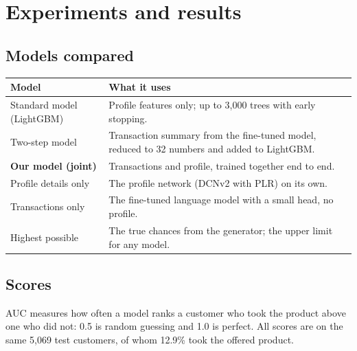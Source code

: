 \documentclass[10pt,a4paper]{article}
\begin{document}
\section{Experiments and results}
\subsection{Models compared}
\begin{tabularx}{\linewidth}{@{}L{4.6cm}X@{}}
\toprule
\textbf{Model} & \textbf{What it uses} \\
\midrule
Standard model (LightGBM) & Profile features only; up to 3,000 trees with early stopping. \\
Two-step model & Transaction summary from the fine-tuned model, reduced to 32 numbers and added to LightGBM. \\
\textbf{Our model (joint)} & Transactions and profile, trained together end to end. \\
Profile details only & The profile network (DCNv2 with PLR) on its own. \\
Transactions only & The fine-tuned language model with a small head, no profile. \\
Highest possible & The true chances from the generator; the upper limit for any model. \\
\bottomrule
\end{tabularx}

\subsection{Scores}
AUC measures how often a model ranks a customer who took the product above one who did not: 0.5 is random guessing and 1.0 is perfect. All scores are on the same 5,069 test customers, of whom 12.9\% took the offered product.
\end{document}
